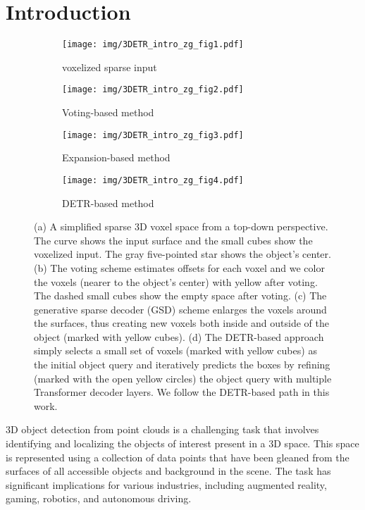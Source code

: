 \documentclass[10pt,twocolumn,letterpaper]{article}
\begin{document}
\section{Introduction}
\begin{figure*}[t]
\centering
\hspace{-12mm}
\begin{subfigure}[b]{0.22\linewidth}
\centering
\texttt{[image: img/3DETR\_intro\_zg\_fig1.pdf]}
\caption{\small{voxelized sparse input}}
\end{subfigure}
\hspace{-2mm}
\begin{subfigure}[b]{0.22\linewidth}
\centering
\texttt{[image: img/3DETR\_intro\_zg\_fig2.pdf]}
\caption{\small{Voting-based method}}
\end{subfigure}\hspace{5mm}
\begin{subfigure}[b]{0.22\linewidth}
\centering
\texttt{[image: img/3DETR\_intro\_zg\_fig3.pdf]}
\caption{\small{Expansion-based method}}
\end{subfigure}\hspace{10mm}
\begin{subfigure}[b]{0.22\linewidth}
\centering
\texttt{[image: img/3DETR\_intro\_zg\_fig4.pdf]}
\caption{DETR-based method}
\end{subfigure}\caption{\small{
(a) A simplified sparse 3D voxel space from a top-down perspective. The curve shows the input surface and the small cubes show the voxelized input. The gray five-pointed star \FiveStar shows the object's center. (b) The voting scheme estimates offsets for each voxel and we color the voxels (nearer to the object's center) with yellow after voting. The dashed small cubes show the empty space after voting. (c) The generative sparse decoder (GSD) scheme enlarges the voxels around the surfaces, thus creating new voxels both inside and outside of the object (marked with yellow cubes).
(d) The DETR-based approach simply selects a small set of voxels (marked with yellow cubes) as the initial object query and iteratively predicts the boxes by refining (marked with the open yellow circles) the object query with multiple Transformer decoder layers. We follow the DETR-based path in this work.
}}
\label{fig:intro_compare_approach}
\vspace{-5mm}
\end{figure*}


3D object detection from point clouds is a challenging task that involves identifying and localizing the objects of interest present in a 3D space. This space is represented using a collection of data points that have been gleaned from the surfaces of all accessible objects and background in the scene.  The task has significant implications for various industries, including augmented reality, gaming, robotics, and autonomous driving.
\end{document}

